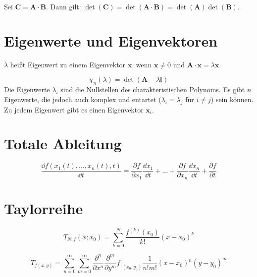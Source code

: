\begin{framedthm}[Multiplikationstheorem]
	Sei $\mathbf{C} = \mathbf{A} \cdot \mathbf{B}$. Dann gilt: $\det(\mathbf{C})= \det(\mathbf{A}\cdot\mathbf{B}) = \det(\mathbf{A}) \det(\mathbf{B})$.
\end{framedthm}

\newpage
\section{Eigenwerte und Eigenvektoren}

\begin{frameddefn}
	$\lambda$ heißt Eigenwert zu einem Eigenvektor $\mathbf{x}$, wenn $\mathbf{x} \neq 0$ und $\mathbf{A} \cdot \mathbf{x} = \lambda \mathbf{x}$.
\end{frameddefn}

\begin{framedprop}
	\[\chi_n(\lambda) = \det(\mathbf{A}-\lambda \mathbb{I}) \]
	Die Eigenwerte $\lambda_i$ sind die Nullstellen des charakteristischen Polynoms. Es gibt $n$ Eigenwerte, die jedoch auch komplex und entartet ($\lambda_i = \lambda_j$ für $i\neq j$) sein können. Zu jedem Eigenwert gibt es einen Eigenvektor $\mathbf{x}_i$.
\end{framedprop}

\section{Totale Ableitung}

\begin{framedprop}
\[
\frac{\dd f(x_1(t), ..., x_n(t), t)}{\dd t} = \frac{\partial f}{\partial x_1} \frac{\dd x_1}{\dd t} + ... + \frac{\partial f}{\partial x_n} \frac{\dd x_n}{\dd t} + \frac{\partial f}{\partial t}
\]
\end{framedprop}

\section{Taylorreihe}

\begin{framedprop}[Taylorreihe]
	\[
	T_{N, f}(x; x_0) = \sum_{k=0}^{N} \frac{f^{(k)}(x_0)}{k!} (x-x_0)^k
	\]
\end{framedprop}

\begin{framedprop}
	\[
	T_{f(x,y)} = \sum_{n=0}^{\infty} \sum_{m=0}^{\infty} \frac{\partial^n}{\partial x^n} \frac{\partial^m}{\partial y^m} f \bigg|_{(x_0,y_0)} \frac{1}{n!m!} (x-x_0)^n (y-y_0)^m
	\]
\end{framedprop}



